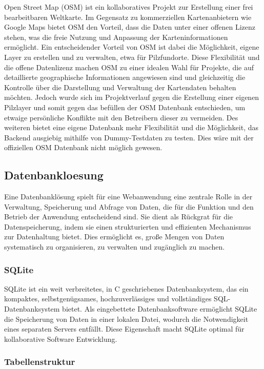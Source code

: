\documentclass[../main.tex]{subfiles}
\begin{document}
Open Street Map (OSM) ist ein kollaboratives Projekt zur Erstellung einer frei bearbeitbaren Weltkarte. Im Gegensatz zu kommerziellen
Kartenanbietern wie Google Maps bietet OSM den Vorteil, dass die Daten unter einer offenen Lizenz stehen, was die freie Nutzung und
Anpassung der Karteninformationen ermöglicht. Ein entscheidender Vorteil von OSM ist dabei die Möglichkeit, eigene Layer zu erstellen und
zu verwalten, etwa für Pilzfundorte. Diese Flexibilität und die offene Datenlizenz machen OSM zu einer idealen Wahl für Projekte, die auf
detaillierte geographische Informationen angewiesen sind und gleichzeitig die Kontrolle über die Darstellung und Verwaltung der Kartendaten
behalten möchten. Jedoch wurde sich im Projektverlauf gegen die Erstellung einer eigenen Pilzlayer und somit gegen das befüllen der OSM Datenbank
entschieden, um etwaige persönliche Konflikte mit den Betreibern dieser zu vermeiden. Des weiteren bietet eine eigene Datenbank mehr Flexibilität
und die Möglichkeit, das Backend ausgiebig mithilfe von Dummy-Testdaten zu testen. Dies wäre mit der offiziellen OSM Datenbank nicht möglich gewesen.

\subsection{Datenbankloesung}

Eine Datenbanklösung spielt für eine Webanwendung eine zentrale Rolle in der Verwaltung, Speicherung und Abfrage von Daten, die für die Funktion und
den Betrieb der Anwendung entscheidend sind. Sie dient als Rückgrat für die Datenspeicherung, indem sie einen strukturierten und effizienten Mechanismus
zur Datenhaltung bietet. Dies ermöglicht es, große Mengen von Daten systematisch zu organisieren, zu verwalten und zugänglich zu machen.

\subsubsection{SQLite}

SQLite ist ein weit verbreitetes, in C geschriebenes Datenbanksystem, das ein kompaktes, selbstgenügsames, hochzuverlässiges und vollständiges SQL-Datenbanksystem
bietet. Als eingebettete Datenbanksoftware ermöglicht SQLite die Speicherung von Daten in einer lokalen Datei, wodurch die Notwendigkeit eines separaten Servers
entfällt. Diese Eigenschaft macht SQLite optimal für kollaborative Software Entwicklung.

\subsubsection{Tabellenstruktur}
\end{document}
